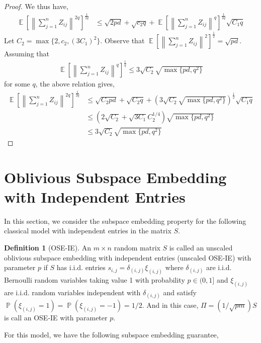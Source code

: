 \documentclass[11pt]{amsart}
\numberwithin{equation}{section}
\numberwithin{equation}{section}
\DeclareMathOperator{\E}{\mathbb{E}}
\DeclareMathOperator{\Pb}{\mathbb{P}}
\theoremstyle{remark}
\theoremstyle{definition}
\newtheorem{definition}[theorem]{Definition}
\begin{document}
\begin{proof}
    We thus have,
    \begin{align*}
        \E \left[ \left\|\sum_{j=1}^n  Z_{ij} \right\|^{2q} \right]^\frac{1}{2q} &\le \sqrt{2 pd} + \sqrt{c_2q} + \E \left[ \left\|\sum_{j=1}^n  Z_{ij} \right\|^{q} \right]^\frac{1}{2q} \sqrt{C_1q} 
    \end{align*}
    Let $C_2=\max\{2,c_2,(3C_1)^2\}$.   Observe that $ \E \left[ \left\|\sum_{j=1}^n  Z_{ij} \right\|^{2} \right]^\frac{1}{2} = \sqrt{pd}$. Assuming that \begin{align*}\E \left[ \left\|\sum_{j=1}^n  Z_{ij} \right\|^{q} \right]^\frac{1}{q} \le 3\sqrt{C_2} \sqrt{\max \{pd, q^2 \}} \end{align*} for some $q$, the above relation gives,
    \begin{align*}
        \E \left[ \left\|\sum_{j=1}^n  Z_{ij} \right\|^{2q} \right]^\frac{1}{2q} &\le \sqrt{C_2pd} + \sqrt{C_2q} + \left( 3\sqrt{C_2}\sqrt{\max \{pd, q^2 \}} \right)^\frac{1}{2} \sqrt{C_1q} \\
        &\le \left( 2\sqrt{C_2} + \sqrt{3C_1}C_2^{1/4} \right) \sqrt{\max \{pd, q^2 \}} \\
        &\le 3\sqrt{C_2} \sqrt{\max \{pd, q^2 \}}
    \end{align*}

\end{proof} \section{Oblivious Subspace Embedding with Independent Entries} \label{sec:oseieproof}

In this section, we consider the subspace embedding property for the following classical model with independent entries in the matrix $S$.

\begin{definition}[OSE-IE]\label{def:oseie}
An $m \times n$ random matrix $S$ is called an unscaled oblivious subspace embedding with independent entries (unscaled OSE-IE) with parameter $p$ if $S$ has i.i.d. entries $s_{i,j}=\delta_{(i,j)} \xi_{(i,j)}$ where $\delta_{(i,j)}$ are i.i.d. Bernoulli random variables taking value 1 with probability $p \in (0,1]$ and $\xi_{(i,j)}$ are i.i.d. random variables independent with $\delta_{(i,j)}$ and satisfy $\Pb(\xi_{(i,j)}=1)=\Pb(\xi_{(i,j)}=-1)=1/2$. And in this case, $\Pi = (1/\sqrt{pm})S$ is call an OSE-IE with parameter $p$.
\end{definition}

For this model, we have the following subspace embedding guarantee,
\end{document}
